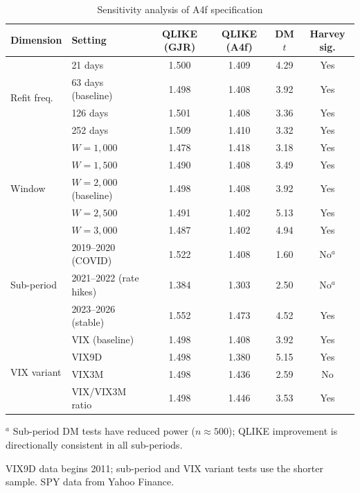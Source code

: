 \documentclass[12pt,a4paper]{article}
\begin{document}
\begin{table}[H]
\centering
\caption{Sensitivity analysis of A4f specification}
\label{tab:sensitivity}
\begin{threeparttable}
\small
\begin{tabular}{@{}llcccc@{}}
\toprule
Dimension & Setting & QLIKE (GJR) & QLIKE (A4f) & DM $t$ & Harvey sig. \\
\midrule
\multirow{4}{*}{Refit freq.} & 21 days & 1.500 & 1.409 & 4.29 & Yes \\
 & 63 days (baseline) & 1.498 & 1.408 & 3.92 & Yes \\
 & 126 days & 1.501 & 1.408 & 3.36 & Yes \\
 & 252 days & 1.509 & 1.410 & 3.32 & Yes \\
\midrule
\multirow{5}{*}{Window} & $W = 1{,}000$ & 1.478 & 1.418 & 3.18 & Yes \\
 & $W = 1{,}500$ & 1.490 & 1.408 & 3.49 & Yes \\
 & $W = 2{,}000$ (baseline) & 1.498 & 1.408 & 3.92 & Yes \\
 & $W = 2{,}500$ & 1.491 & 1.402 & 5.13 & Yes \\
 & $W = 3{,}000$ & 1.487 & 1.402 & 4.94 & Yes \\
\midrule
\multirow{3}{*}{Sub-period} & 2019--2020 (COVID) & 1.522 & 1.408 & 1.60 & No$^a$ \\
 & 2021--2022 (rate hikes) & 1.384 & 1.303 & 2.50 & No$^a$ \\
 & 2023--2026 (stable) & 1.552 & 1.473 & 4.52 & Yes \\
\midrule
\multirow{4}{*}{VIX variant} & VIX (baseline) & 1.498 & 1.408 & 3.92 & Yes \\
 & VIX9D & 1.498 & 1.380 & 5.15 & Yes \\
 & VIX3M & 1.498 & 1.436 & 2.59 & No \\
 & VIX/VIX3M ratio & 1.498 & 1.446 & 3.53 & Yes \\
\bottomrule
\end{tabular}
\begin{tablenotes}
\footnotesize
\item $^a$ Sub-period DM tests have reduced power ($n \approx 500$); QLIKE improvement is directionally consistent in all sub-periods.
\item VIX9D data begins 2011; sub-period and VIX variant tests use the shorter sample. SPY data from Yahoo Finance.
\end{tablenotes}
\end{threeparttable}
\end{table}
\end{document}

